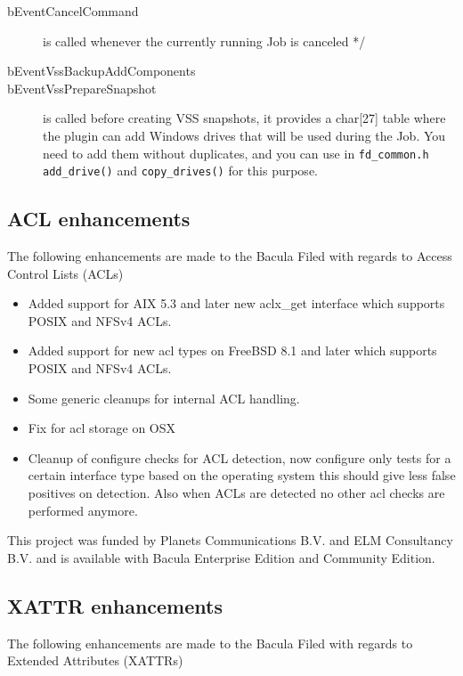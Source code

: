 \begin{description}
\item [bEventCancelCommand] is called whenever the currently
  running Job is canceled */

\item [bEventVssBackupAddComponents] 

\item [bEventVssPrepareSnapshot] is called before creating VSS snapshots, it
  provides a char[27] table where the plugin can add Windows drives that will
  be used during the Job. You need to add them without duplicates, and you can
  use in \texttt{fd\_common.h} \texttt{add\_drive()} and \texttt{copy\_drives()}
  for this purpose.
\end{description}

\subsection{ACL enhancements}

The following enhancements are made to the Bacula Filed with regards to
Access Control Lists (ACLs)

\begin{itemize}
\item Added support for AIX 5.3 and later new aclx\_get interface which supports
  POSIX and NFSv4 ACLs.
\item Added support for new acl types on FreeBSD 8.1 and later which supports
  POSIX and NFSv4 ACLs.
\item Some generic cleanups for internal ACL handling.
\item Fix for acl storage on OSX
\item Cleanup of configure checks for ACL detection, now configure only
  tests for a certain interface type based on the operating system
  this should give less false positives on detection. Also when ACLs
  are detected no other acl checks are performed anymore.
\end{itemize}

\medskip
This project was funded by Planets Communications B.V. and ELM Consultancy B.V.
and is available with Bacula Enterprise Edition and Community Edition.

\subsection{XATTR enhancements}

The following enhancements are made to the Bacula Filed with regards to
Extended Attributes (XATTRs)

